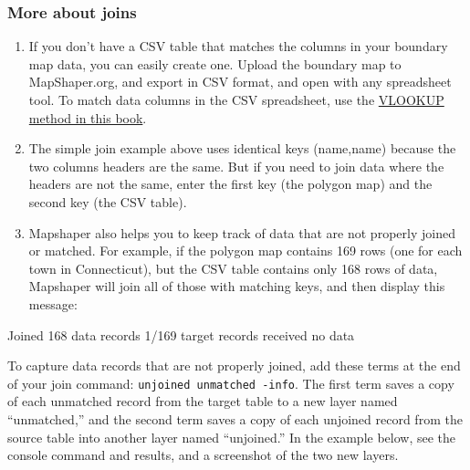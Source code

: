 \documentclass[
  english,
]{book}
\newenvironment{Shaded}{\begin{snugshade}}{\end{snugshade}}
\newcommand{\NormalTok}[1]{#1}
\begin{document}
\hypertarget{more-about-joins}{%
\subsubsection*{More about joins}\label{more-about-joins}}

\begin{enumerate}
\def\labelenumi{\arabic{enumi}.}
\item
  If you don't have a CSV table that matches the columns in your boundary map data, you can easily create one. Upload the boundary map to MapShaper.org, and export in CSV format, and open with any spreadsheet tool. To match data columns in the CSV spreadsheet, use the \href{vlookup}{VLOOKUP method in this book}.
\item
  The simple join example above uses identical keys (name,name) because the two columns headers are the same. But if you need to join data where the headers are not the same, enter the first key (the polygon map) and the second key (the CSV table).
\item
  Mapshaper also helps you to keep track of data that are not properly joined or matched. For example, if the polygon map contains 169 rows (one for each town in Connecticut), but the CSV table contains only 168 rows of data, Mapshaper will join all of those with matching keys, and then display this message:
\end{enumerate}

\begin{Shaded}
\begin{Highlighting}[]
\NormalTok{Joined 168 data records}
\NormalTok{1/169 target records received no data}
\end{Highlighting}
\end{Shaded}

To capture data records that are not properly joined, add these terms at the end of your join command: \texttt{unjoined\ unmatched\ -info}. The first term saves a copy of each unmatched record from the target table to a new layer named ``unmatched,'' and the second term saves a copy of each unjoined record from the source table into another layer named ``unjoined.'' In the example below, see the console command and results, and a screenshot of the two new layers.

\begin{Shaded}
\end{Shaded}
\end{document}
